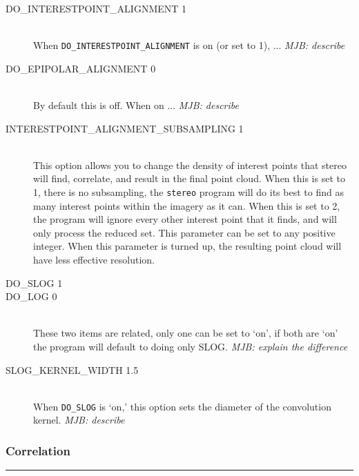 \begin{description}
\item[DO\_INTERESTPOINT\_ALIGNMENT 1] \hfill \\
When \texttt{DO\_INTERESTPOINT\_ALIGNMENT} is on (or set to 1), ... \emph{MJB: describe}

\item[DO\_EPIPOLAR\_ALIGNMENT 0] \hfill \\
By default this is off.  When on ... \emph{MJB: describe}

\item[INTERESTPOINT\_ALIGNMENT\_SUBSAMPLING 1] \hfill \\
This option allows you to change the density of interest points
that stereo will find, correlate, and result in the final point
cloud.  When this is set to 1, there is no subsampling, the
\texttt{stereo} program will do its best to find as many interest
points within the imagery as it can.  When this is set to 2, the
program will ignore every other interest point that it finds, and
will only process the reduced set.  This parameter can be set to
any positive integer.  When this parameter is turned up, the resulting
point cloud will have less effective resolution.

\item[DO\_SLOG 1]
\item[DO\_LOG 0] \hfill \\
These two items are related, only one can be set to `on', if both
are `on' the program will default to doing only SLOG.  \emph{MJB: explain the difference}

\item[SLOG\_KERNEL\_WIDTH 1.5] \hfill \\
When \texttt{DO\_SLOG} is `on,' this option sets the diameter of
the convolution kernel. \emph{MJB: describe}

\end{description}

\subsubsection*{Correlation}
\hrule
\bigskip

